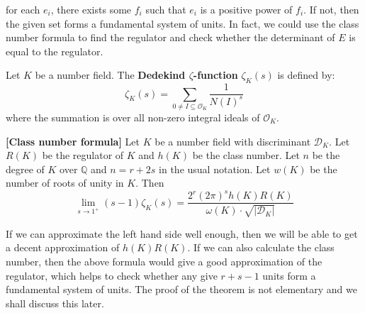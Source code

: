for each $e_i$, there exists some $f_i$ such that $e_i$ is a positive power of $f_i$. If not, then
the given set forms a fundamental system of units. In fact, we could use the class number formula to find the
regulator and check whether the determinant of $E$ is equal to the regulator.
\begin{definition} Let $K$ be a number field. The {\bf Dedekind $\zeta$-function} $\zeta_K(s)$ is defined by:
$$\zeta_K(s)=\sum_{0 \neq I \subseteq \mathcal{O}_K}\frac{1}{N(I)^{s}}$$
where the summation is over all non-zero integral ideals of $\mathcal{O}_K$.
\end{definition}
\begin{theorem}{\bf [Class number formula]}\label{C;Classnumber formula} Let $K$ be a number field with discriminant $\mathcal{D}_K$. Let $R(K)$ be the regulator of $K$
and $h(K)$ be the class number. Let $n$ be the degree of $K$ over $\mathbb{Q}$ and $n=r+2s$ in the usual notation.
Let $w(K)$ be the number of roots of unity in $K$. Then
$$\lim_{s \to 1^+}(s-1)\zeta_K(s)=\frac{2^r (2\pi)^s h(K)R(K)}{\omega(K) \cdot \sqrt{|\mathcal{D}_K|}}$$
\end{theorem}
If we can approximate the left hand side well enough, then we will be able to get a decent approximation
of $h(K)R(K)$. If we can also calculate the class number, then the above formula would give a good
approximation of the regulator, which helps to check whether any give $r+s-1$ units form a fundamental system
of units. The proof of the theorem is not elementary and we shall discuss this later.
